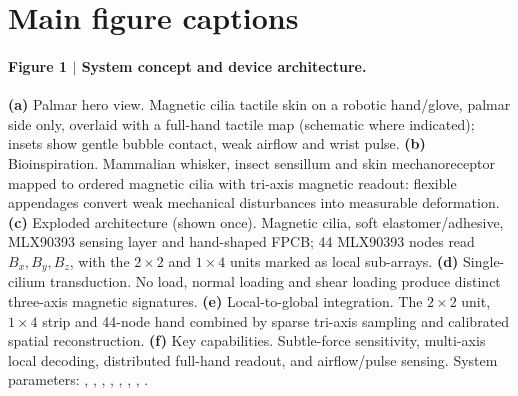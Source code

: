 \section*{Main figure captions}

\paragraph{Figure 1 $\vert$ System concept and device architecture.}
\textbf{(a)} Palmar hero view. Magnetic cilia tactile skin on a robotic
hand/glove, palmar side only, overlaid with a full-hand tactile map
(schematic where indicated); insets show gentle bubble contact, weak airflow
and wrist pulse. \textbf{(b)} Bioinspiration. Mammalian whisker, insect
sensillum and skin mechanoreceptor mapped to ordered magnetic cilia with
tri-axis magnetic readout: flexible appendages convert weak mechanical
disturbances into measurable deformation. \textbf{(c)} Exploded architecture
(shown once). Magnetic cilia, soft elastomer/adhesive, MLX90393 sensing
layer and hand-shaped FPCB; 44 MLX90393 nodes read $B_x,B_y,B_z$, with the
$2\times2$ and $1\times4$ units marked as local sub-arrays.
\textbf{(d)} Single-cilium transduction. No load, normal loading and shear
loading produce distinct three-axis magnetic signatures.
\textbf{(e)} Local-to-global integration. The $2\times2$ unit, $1\times4$
strip and 44-node hand combined by sparse tri-axis sampling and calibrated
spatial reconstruction. \textbf{(f)} Key capabilities. Subtle-force
sensitivity, multi-axis local decoding, distributed full-hand readout, and
airflow/pulse sensing. System parameters: ,
, ,
, , ,
, .


